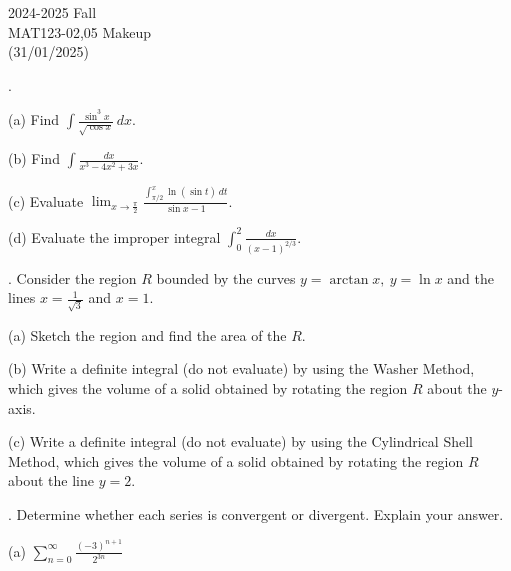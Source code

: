 \documentclass{article}
\begin{document}
\pagestyle{empty}
\large

\begin{center}
2024-2025 Fall \\MAT123-02,05 Makeup\\(31/01/2025)
\end{center}

.

\hfill

\noindent (a) Find $\displaystyle\int\frac{\sin^3x}{\sqrt{\cos x}}\,dx$.

\hfill

\hfill

\noindent (b) Find $\displaystyle\int\frac{dx}{x^3-4x^2+3x}$.

\hfill

\hfill

\noindent (c) Evaluate $\displaystyle\lim_{x\to\textstyle\frac\pi2}\frac{\displaystyle\int_{\pi/2}^x\ln(\sin t)\,dt}{\sin x-1}$.

\hfill

\hfill

\noindent (d) Evaluate the improper integral $\displaystyle\int_0^2\frac{dx}{(x-1)^{2/3}}$.

\hfill

\hfill

. Consider the region $R$ bounded by the curves $y=\arctan x,\:y=\ln x$ and the lines $\displaystyle x=\frac1{\sqrt3}$ and $x=1$.

\hfill

\noindent (a) Sketch the region and find the area of the $R$. 

\hfill

\noindent (b) Write a definite integral (do not evaluate) by using the Washer Method, which gives the volume of a solid obtained by rotating the region $R$ about the $y$-axis.

\hfill

\noindent (c) Write a definite integral (do not evaluate) by using the Cylindrical Shell Method, which gives the volume of a solid obtained by rotating the region $R$ about the line $y=2$.

\hfill

. Determine whether each series is convergent or divergent. Explain your answer.

\hfill

\noindent (a) $\displaystyle\sum_{n=0}^\infty\frac{(-3)^{n+1}}{2^{3n}}$

\hfill
\end{document}
